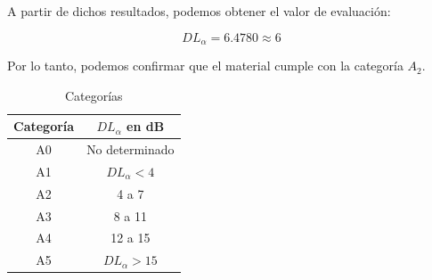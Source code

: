\par A partir de dichos resultados, podemos obtener el valor de evaluación:

\begin{equation*}
    \boxed{DL_{\alpha} =  6.4780 \approx 6}
\end{equation*}

\par Por lo tanto, podemos confirmar que el material cumple con la categoría $A_2$.


\begin{table}[H]
\setlength\arrayrulewidth{1pt}
    \centering
    \begin{tabular}{|c|c|} \hline
        \textbf{Categoría} & \textbf{$DL_\alpha$ en dB} \\ \hline \hline
        A0& No determinado \\ \hline
        A1& $DL_\alpha < 4$ \\ \hline
        A2& 4 a 7 \\ \hline
        A3& 8 a 11 \\ \hline
        A4& 12 a 15 \\ \hline
        A5& $DL_\alpha >15$ \\ \hline
    \end{tabular}
    \caption{Categorías}
    \label{tab:my_label}
\end{table}